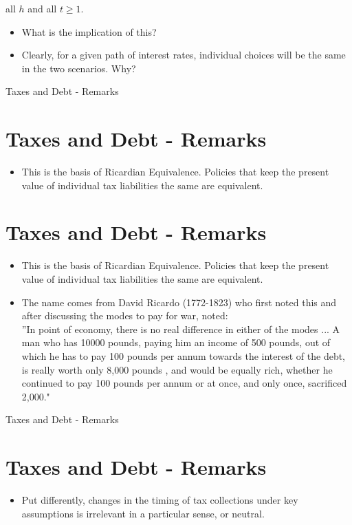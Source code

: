 \documentclass[10pt]{article}
\begin{document}
all $h$ and all $t \geq 1$.

\begin{itemize}
  \item What is the implication of this?
  \item Clearly, for a given path of interest rates, individual choices will be the same in the two scenarios. Why?
\end{itemize}

Taxes and Debt - Remarks

\section*{Taxes and Debt - Remarks}
\begin{itemize}
  \item This is the basis of Ricardian Equivalence. Policies that keep the present value of individual tax liabilities the same are equivalent.
\end{itemize}

\section*{Taxes and Debt - Remarks}
\begin{itemize}
  \item This is the basis of Ricardian Equivalence. Policies that keep the present value of individual tax liabilities the same are equivalent.
  \item The name comes from David Ricardo (1772-1823) who first noted this and after discussing the modes to pay for war, noted:\\
''In point of economy, there is no real difference in either of the modes ... A man who has 10000 pounds, paying him an income of 500 pounds, out of which he has to pay 100 pounds per annum towards the interest of the debt, is really worth only 8,000 pounds , and would be equally rich, whether he continued to pay 100 pounds per annum or at once, and only once, sacrificed 2,000."
\end{itemize}

Taxes and Debt - Remarks

\section*{Taxes and Debt - Remarks}
\begin{itemize}
  \item Put differently, changes in the timing of tax collections under key assumptions is irrelevant in a particular sense, or neutral.
\end{itemize}
\end{document}
